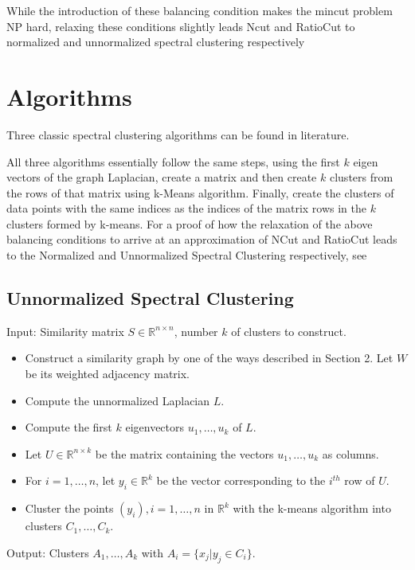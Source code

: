 \documentclass[10pt,a4paper, nocenter]{report}
\begin{document}
        While the introduction of these balancing condition makes the mincut problem NP hard, relaxing these conditions slightly leads Ncut and RatioCut to normalized and unnormalized spectral clustering respectively \cite{Luxburg2007}

    \section{Algorithms}

    Three classic spectral clustering algorithms can be found in literature.

    All three algorithms essentially follow the same steps, using the first $k$ eigen vectors of the graph Laplacian, create a matrix and then create $k$ clusters from the rows of that matrix using k-Means algorithm. Finally, create the clusters of data points with the same indices as the indices of the matrix rows in the $k$ clusters formed by k-means. For a proof of how the relaxation of the above balancing conditions to arrive at an approximation of NCut and RatioCut leads to the Normalized and Unnormalized Spectral Clustering respectively, see \cite{Luxburg2007}
	
	\subsection{Unnormalized Spectral Clustering}
	
	Input: Similarity matrix $S \in \mathbb{R}^{n\times n}$, number $k$ of clusters to construct.
	\begin{itemize}
		\item Construct a similarity graph by one of the ways described in Section 2. Let $W$ be its weighted adjacency matrix.
		\item Compute the unnormalized Laplacian $L$.
		\item Compute the first $k$ eigenvectors $u_{1},\dots, u_{k} $ of $L$.
		\item Let $U \in \mathbb{R}^{n\times k}$ be the matrix containing the vectors $u_{1},\dots, u_{k}$ as columns.
		\item For $i = 1,\dots, n$, let $y_{i} \in \mathbb{R}^k$ be the vector corresponding to the $i^{th}$ row of $U$.
		\item Cluster the points $(y_{i}), i=1,\dots,n$ in $\mathbb{R}^k$ with the k-means algorithm into clusters
		$C_{1},\dots, C_{k}$.
	\end{itemize}
	Output: Clusters $A_{1},\dots, A_{k}$ with $A_{i} = \{x_{j}| y_{j} \in C_{i}\}$.
	
\end{document}
